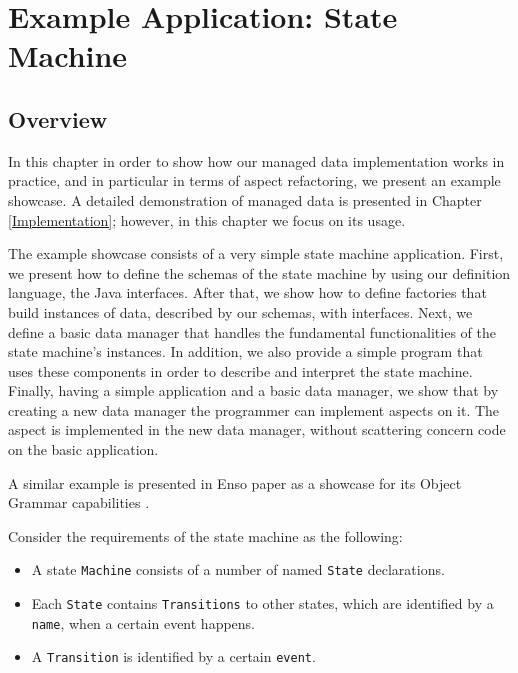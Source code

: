 
\chapter{Example Application: State Machine}\label{Example Application}

\section{Overview}
In this chapter in order to show how our managed data implementation works in practice, and in particular in terms of aspect refactoring, we present an example showcase.
A detailed demonstration of managed data is presented in Chapter \ref{Implementation}; however, in this chapter we focus on its usage.

The example showcase consists of a very simple state machine application.
First, we present how to define the schemas of the state machine by using our definition language, the Java interfaces.
After that, we show how to define factories that build instances of data, described by our schemas, with interfaces.
Next, we define a basic data manager that handles the fundamental functionalities of the state machine's instances.
In addition, we also provide a simple program that uses these components in order to describe and interpret the state machine.
Finally, having a simple application and a basic data manager, we show that by creating a new data manager the programmer can implement aspects on it.
The aspect is implemented in the new data manager, without scattering concern code on the basic application.

A similar example is presented in Enso paper as a showcase for its Object Grammar capabilities \cite{storm2012object}.

Consider the requirements of the state machine as the following: 
\begin{itemize}
	\item A state \texttt{Machine} consists of a number of named \texttt{State} declarations.

	\item Each \texttt{State} contains \texttt{Transitions} to other states, which are identified by a \texttt{name}, when a certain event happens.

	\item A \texttt{Transition} is identified by a certain \texttt{event}.
\end{itemize}

